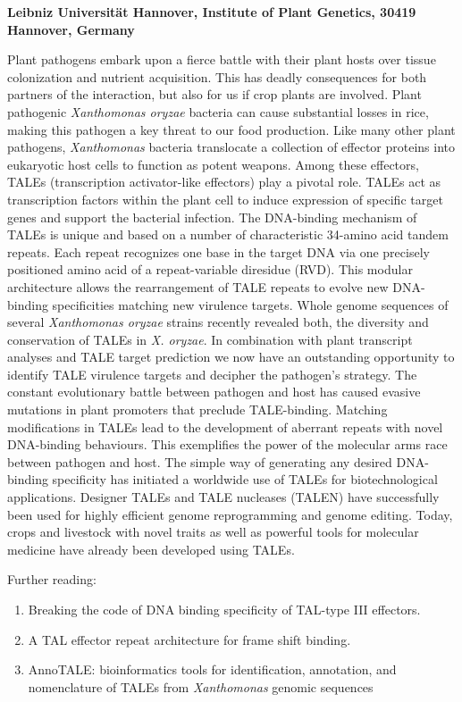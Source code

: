 \documentclass[12pt,]{book}
\providecommand{\tightlist}{%
  \setlength{\itemsep}{0pt}\setlength{\parskip}{0pt}}
\theoremstyle{definition}
\theoremstyle{definition}
\theoremstyle{remark}
\begin{document}
\textbf{Leibniz Universität Hannover, Institute of Plant Genetics, 30419
Hannover, Germany}

Plant pathogens embark upon a fierce battle with their plant hosts over
tissue colonization and nutrient acquisition. This has deadly
consequences for both partners of the interaction, but also for us if
crop plants are involved. Plant pathogenic \emph{Xanthomonas oryzae}
bacteria can cause substantial losses in rice, making this pathogen a
key threat to our food production. Like many other plant pathogens,
\emph{Xanthomonas} bacteria translocate a collection of effector
proteins into eukaryotic host cells to function as potent weapons. Among
these effectors, TALEs (transcription activator-like effectors) play a
pivotal role. TALEs act as transcription factors within the plant cell
to induce expression of specific target genes and support the bacterial
infection. The DNA-binding mechanism of TALEs is unique and based on a
number of characteristic 34-amino acid tandem repeats. Each repeat
recognizes one base in the target DNA via one precisely positioned amino
acid of a repeat-variable diresidue (RVD). This modular architecture
allows the rearrangement of TALE repeats to evolve new DNA-binding
specificities matching new virulence targets. Whole genome sequences of
several \emph{Xanthomonas oryzae} strains recently revealed both, the
diversity and conservation of TALEs in \emph{X. oryzae}. In combination
with plant transcript analyses and TALE target prediction we now have an
outstanding opportunity to identify TALE virulence targets and decipher
the pathogen's strategy. The constant evolutionary battle between
pathogen and host has caused evasive mutations in plant promoters that
preclude TALE-binding. Matching modifications in TALEs lead to the
development of aberrant repeats with novel DNA-binding behaviours. This
exemplifies the power of the molecular arms race between pathogen and
host. The simple way of generating any desired DNA-binding specificity
has initiated a worldwide use of TALEs for biotechnological
applications. Designer TALEs and TALE nucleases (TALEN) have
successfully been used for highly efficient genome reprogramming and
genome editing. Today, crops and livestock with novel traits as well as
powerful tools for molecular medicine have already been developed using
TALEs.

Further reading:

\begin{enumerate}
\def\labelenumi{\arabic{enumi}.}
\tightlist
\item
  \citet{Boch:2009fc} Breaking the code of DNA binding specificity of
  TAL-type III effectors.
\item
  \citet{Richter:2014kz} A TAL effector repeat architecture for frame
  shift binding.
\item
  \citet{Grau:2016ft} AnnoTALE: bioinformatics tools for identification,
  annotation, and nomenclature of TALEs from \emph{Xanthomonas} genomic
  sequences
\end{enumerate}
\end{document}
